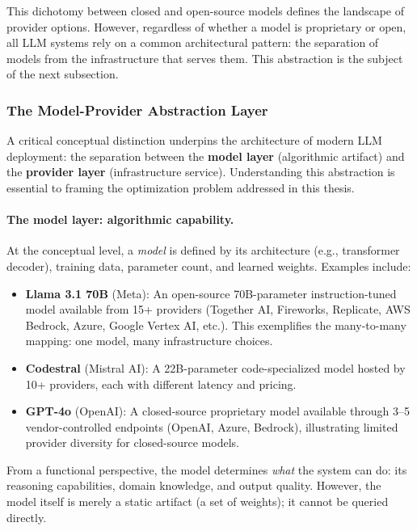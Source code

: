 \documentclass[english]{article}
\begin{document}
This dichotomy between closed and open-source models defines the landscape of provider options. However, regardless of whether a model is proprietary or open, all LLM systems rely on a common architectural pattern: the separation of models from the infrastructure that serves them. This abstraction is the subject of the next subsection.

\subsubsection{The Model-Provider Abstraction Layer}

A critical conceptual distinction underpins the architecture of modern LLM deployment: the separation between the \textbf{model layer} (algorithmic artifact) and the \textbf{provider layer} (infrastructure service). Understanding this abstraction is essential to framing the optimization problem addressed in this thesis.

\paragraph{The model layer: algorithmic capability.}

At the conceptual level, a \textit{model} is defined by its architecture (e.g., transformer decoder), training data, parameter count, and learned weights. Examples include:
\begin{itemize}
    \item \textbf{Llama 3.1 70B} (Meta): An open-source 70B-parameter instruction-tuned model \parencite{llama3_2024} available from 15+ providers (Together AI, Fireworks, Replicate, AWS Bedrock, Azure, Google Vertex AI, etc.). This exemplifies the many-to-many mapping: one model, many infrastructure choices.

    \item \textbf{Codestral} (Mistral AI): A 22B-parameter code-specialized model \parencite{mistral_codestral} hosted by 10+ providers, each with different latency and pricing.

    \item \textbf{GPT-4o} (OpenAI): A closed-source proprietary model \parencite{gpt4_technical_report} available through 3--5 vendor-controlled endpoints (OpenAI, Azure, Bedrock), illustrating limited provider diversity for closed-source models.
\end{itemize}

From a functional perspective, the model determines \emph{what} the system can do: its reasoning capabilities, domain knowledge, and output quality. However, the model itself is merely a static artifact (a set of weights); it cannot be queried directly.
\end{document}
